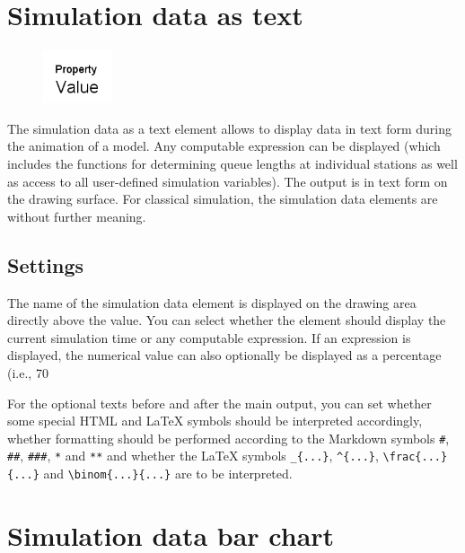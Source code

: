 \section{Simulation data as text}
\label{ref:ModelElementAnimationText}

\begin{figure}
\vspace{-22pt}
\includegraphics[width=2cm]{imageModelElementAnimationText.png}
\vspace{-22pt}
\end{figure}

The simulation data as a text element allows to display data in text form during the animation of a model.
Any computable expression can be displayed (which includes the functions for determining queue lengths at
individual stations as well as access to all user-defined simulation variables). The output is in text form
on the drawing surface. For classical simulation, the simulation data elements are without further meaning.

\subsection*{Settings}

The name of the simulation data element is displayed on the drawing area directly above the value.
You can select whether the element should display the current simulation time or any computable expression.
If an expression is displayed, the numerical value can also optionally be displayed as a percentage
(i.e., 70%

For the optional texts before and after the main output, you can set whether some special HTML and LaTeX symbols should
be interpreted accordingly, whether formatting should be performed according to the Markdown symbols
\texttt{\#}, \texttt{\#\#}, \texttt{\#\#\#}, \texttt{*} and \texttt{**} and whether the LaTeX symbols
\texttt{\_\{...\}}, \texttt{\^{}\{...\}}, \texttt{\textbackslash frac\{...\}\{...\}} and \texttt{\textbackslash binom\{...\}\{...\}}
are to be interpreted.


\section{Simulation data bar chart}
\label{ref:ModelElementAnimationBarChart}

